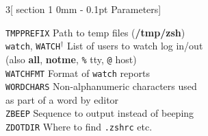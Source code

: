 \documentclass{article}
\makeatletter
\renewcommand{\section}{\@startsection
  {section}%
  {1}%
  {0mm}%
  {-\baselineskip}%
  {0.1pt}%
  {\normalfont\normalsize\scshape}} %
\newcommand\B[1]{\textbf{#1}}
\newcommand\T[1]{\texttt{#1}}
\newcommand\D{$^\dag$}
\makeatother
\begin{document}
\begin{multicols}{3}[\section{Parameters}]
\begin{tabbing}
\T{TMPPREFIX}      \>\> Path to temp files (\B{/tmp/zsh}) \\
\T{watch}, \T{WATCH}\D \>\> List of users to watch log in/out \\
              \>\> (also \B{all}, \B{notme}, \verb!%! tty, \verb!@! host) \\
\T{WATCHFMT}       \>\> Format of \T{watch} reports \\
\T{WORDCHARS}      \>\> Non-alphanumeric characters used \\
                   \>\> as part of a word by editor \\
\T{ZBEEP}          \>\> Sequence to output instead of beeping \\
\T{ZDOTDIR}        \>\> Where to find \verb!.zshrc! etc.\ \\
\end{tabbing}
\end{multicols}
\end{document}
